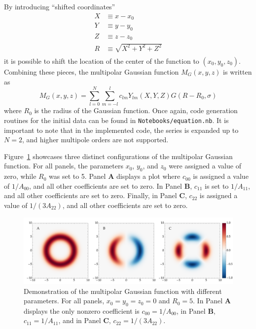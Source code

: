 %
By introducing ``shifted coordinates''
%
\begin{align}
  X & \equiv x - x_0 \label{eq:wave_scattering_real_spherical_harmonics_shifted_x}                \\
  Y & \equiv y - y_0 \label{eq:wave_scattering_real_spherical_harmonics_shifted_y}                \\
  Z & \equiv z - z_0 \label{eq:wave_scattering_real_spherical_harmonics_shifted_z}                \\
  R & \equiv \sqrt{X^2 + Y^2 + Z^2} \label{eq:wave_scattering_real_spherical_harmonics_shifted_r} \\
\end{align}
%
it is possible to shift the location of the center of the function to $(x_0,y_0,z_0)$. Combining these pieces, the multipolar Gaussian function $M_G(x,y,z)$ is written as
%
\begin{equation}
  M_G(x, y, z) = \sum_{l=0}^{N}\sum_{m = -l}^{l} c_{l m} Y_{l m}(X,Y,Z) G(R-R_0,\sigma)
  \label{eq:wave_scattering_multipolar_gaussian}
\end{equation}
%
where $R_0$ is the radius of the Gaussian function. Once again, code generation routines for the initial data can be found in \texttt{Notebooks/equation.nb}. It is important to note that in the implemented code, the series is expanded up to $N = 2$, and higher multipole orders are not supported.

Figure~\ref{fig:multipolar_gaussian_id_demo} showcases three distinct configurations of the multipolar Gaussian function. For all panels, the parameters $x_0$, $y_0$, and $z_0$ were assigned a value of zero, while $R_0$ was set to 5. Panel \textbf{A} displays a plot where $c_{00}$ is assigned a value of $1/A_{00}$, and all other coefficients are set to zero. In Panel \textbf{B}, $c_{11}$ is set to $1/A_{11}$, and all other coefficients are set to zero. Finally, in Panel \textbf{C}, $c_{22}$ is assigned a value of $1/(3A_{22})$, and all other coefficients are set to zero.

\begin{figure}[!ht]
  \centering
  \includegraphics[width=\linewidth]{img/wave_scattering/multipolar_gaussian_id_examples.png}
  \caption{Demonstration of the multipolar Gaussian function with different parameters. For all panels, $x_0 = y_0 = z_0 = 0$ and $R_0 = 5$. In Panel \textbf{A} displays the only nonzero coefficient is $c_{00} = 1/A_{00}$, in Panel \textbf{B}, $c_{11} = 1/A_{11}$, and in Panel \textbf{C}, $c_{22} = 1/(3A_{22})$.}
  \label{fig:multipolar_gaussian_id_demo}
\end{figure}

